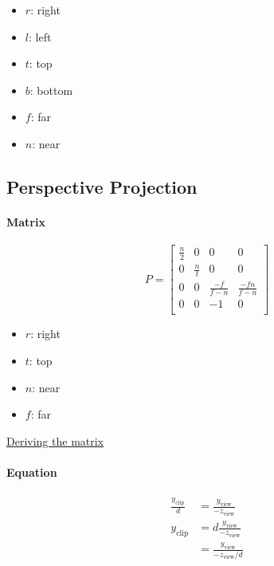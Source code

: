     \begin{itemize}
      \item $ r $: right
      \item $ l $: left
      \item $ t $: top
      \item $ b $: bottom
      \item $ f $: far
      \item $ n $: near
    \end{itemize}

  \subsection{Perspective Projection}

    \paragraph{Matrix}
    \begin{equation}
      P =
      \begin{bmatrix}
        \frac{n}{2} & 0 & 0 & 0 \\
        0 & \frac{n}{t} & 0 & 0 \\
        0 & 0 & \frac{-f}{f - n} & \frac{-fn}{f - n} \\
        0 & 0 & -1 & 0 \\
      \end{bmatrix}
    \end{equation}

    \begin{itemize}
      \item $ r $: right
      \item $ t $: top
      \item $ n $: near
      \item $ f $: far
    \end{itemize}

    \href{http://www.songho.ca/opengl/gl_projectionmatrix.html}{Deriving
    the matrix}

    \paragraph{Equation}
    \begin{align}
      \frac{y_{\text{clip}}}{d} &= \frac{y_{\text{view}}}{-z_{\text{view}}} \\
      y_{\text{clip}}
      &= d\frac{y_ {\text{view}}}{-z_{\text{view}}} \\
      &= \frac{y_{\text{view}}}{-z_{\text{view}} / d}
    \end{align}

